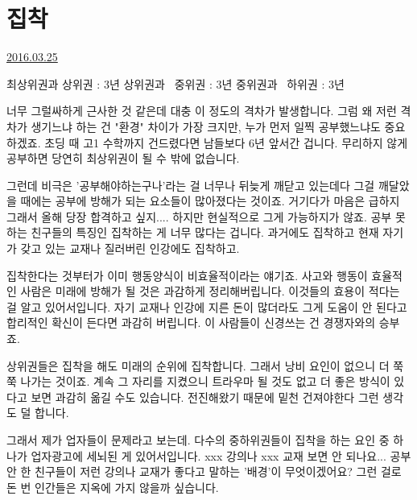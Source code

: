 \section{집착}
\href{https://www.kockoc.com/Apoc/694074}{2016.03.25}

\vspace{5mm}

최상위권과 상위권 : 3년
상위권과  중위권 : 3년
중위권과  하위권 : 3년
\vspace{5mm}

너무 그럴싸하게 근사한 것 같은데 대충 이 정도의 격차가 발생합니다.
그럼 왜 저런 격차가 생기느냐 하는 건 "환경" 차이가 가장 크지만, 누가 먼저 일찍 공부했느냐도 중요하겠죠.
초딩 때 고1 수학까지 건드렸다면 남들보다 6년 앞서간 겁니다. 무리하지 않게 공부하면 당연히 최상위권이 될 수 밖에 없습니다.
\vspace{5mm}

그런데 비극은 '공부해야하는구나'라는 걸 너무나 뒤늦게 깨닫고 있는데다
그걸 깨달았을 때에는 공부에 방해가 되는 요소들이 많아졌다는 것이죠.
거기다가 마음은 급하지 그래서 올해 당장 합격하고 싶지.... 하지만 현실적으로 그게 가능하지가 않죠.
공부 못 하는 친구들의 특징인 집착하는 게 너무 많다는 겁니다.
과거에도 집착하고 현재 자기가 갖고 있는 교재나 질러버린 인강에도 집착하고.
\vspace{5mm}

집착한다는 것부터가 이미 행동양식이 비효율적이라는 얘기죠.
사고와 행동이 효율적인 사람은 미래에 방해가 될 것은 과감하게 정리해버립니다. 이것들의 효용이 적다는 걸 알고 있어서입니다.
자기 교재나 인강에 지른 돈이 많더라도 그게 도움이 안 된다고 합리적인 확신이 든다면 과감히 버립니다.
이 사람들이 신경쓰는 건 경쟁자와의 승부죠.
\vspace{5mm}

상위권들은 집착을 해도 미래의 순위에 집착합니다. 그래서 낭비 요인이 없으니 더 쭉쭉 나가는 것이죠.
계속 그 자리를 지켰으니 트라우마 될 것도 없고 더 좋은 방식이 있다고 보면 과감히 옮길 수도 있습니다.
전진해왔기 때문에 밑천 건져야한다 그런 생각도 덜 합니다.
\vspace{5mm}

그래서 제가 업자들이 문제라고 보는데. 다수의 중하위권들이 집착을 하는 요인 중 하나가 업자광고에 세뇌된 게 있어서입니다.
xxx 강의나 xxx 교재 보면 안 되나요... 공부 안 한 친구들이 저런 강의나 교재가 좋다고 말하는 '배경'이 무엇이겠어요?
그런 걸로 돈 번 인간들은 지옥에 가지 않을까 싶습니다.
\vspace{5mm}










